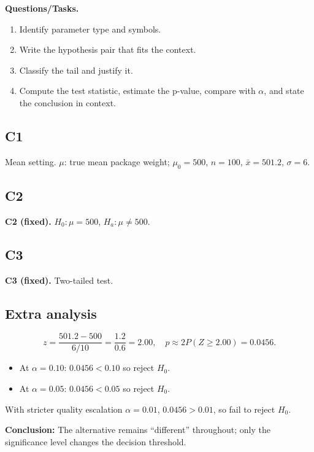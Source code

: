\textbf{Questions/Tasks.}
\begin{enumerate}
    \item[(C1)] Identify parameter type and symbols.
    \item[(C2)] Write the hypothesis pair that fits the context.
    \item[(C3)] Classify the tail and justify it.
    \item[(Extra analysis)] Compute the test statistic, estimate the p-value, compare with \(\alpha\), and state the conclusion in context.
\end{enumerate}

\subsection*{C1}
Mean setting. \(\mu\): true mean package weight; \(\mu_0=500\), \(n=100\), \(\bar{x}=501.2\), \(\sigma=6\).

\subsection*{C2}
\textbf{C2 (fixed).} \(H_0:\mu=500\), \(H_a:\mu\ne 500\).

\subsection*{C3}
\textbf{C3 (fixed).} Two-tailed test. \TwoTailGraph

\subsection*{Extra analysis}
\[
z=\frac{501.2-500}{6/10}=\frac{1.2}{0.6}=2.00,
\quad p\approx 2P(Z\ge 2.00)=0.0456.
\]
\begin{itemize}
\item At \(\alpha=0.10\): \(0.0456<0.10\) so reject \(H_0\).
\item At \(\alpha=0.05\): \(0.0456<0.05\) so reject \(H_0\).
\end{itemize}
With stricter quality escalation \(\alpha=0.01\), \(0.0456>0.01\), so fail to reject \(H_0\).

\textbf{Conclusion:} The alternative remains ``different'' throughout; only the significance level changes the decision threshold.


